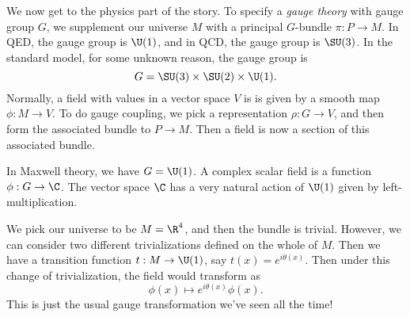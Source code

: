 \documentclass[a4paper]{article}
\begin{document}
We now get to the physics part of the story. To specify a \emph{gauge theory} with gauge group $G$, we supplement our universe $M$ with a principal $G$-bundle $\pi: P \to M$. In QED, the gauge group is $\U(1)$, and in QCD, the gauge group is $\SU(3)$. In the standard model, for some unknown reason, the gauge group is
\[
  G = \SU(3) \times \SU(2) \times \U(1).
\]
Normally, a field with values in a vector space $V$ is is given by a smooth map $\phi: M \to V$. To do gauge coupling, we pick a representation $\rho: G \to V$, and then form the associated bundle to $P \to M$. Then a field is now a section of this associated bundle.

\begin{eg}
  In Maxwell theory, we have $G = \U(1)$. A complex scalar field is a function $\phi: G \to \C$. The vector space $\C$ has a very natural action of $\U(1)$ given by left-multiplication.

  We pick our universe to be $M = \R^4$, and then the bundle is trivial. However, we can consider two different trivializations defined on the whole of $M$. Then we have a transition function $t: M \to \U(1)$, say $t(x) = e^{i \theta(x)}$. Then under this change of trivialization, the field would transform as
  \[
    \phi(x) \mapsto e^{i\theta(x)} \phi(x).
  \]
  This is just the usual gauge transformation we've seen all the time!
\end{eg}
\end{document}
